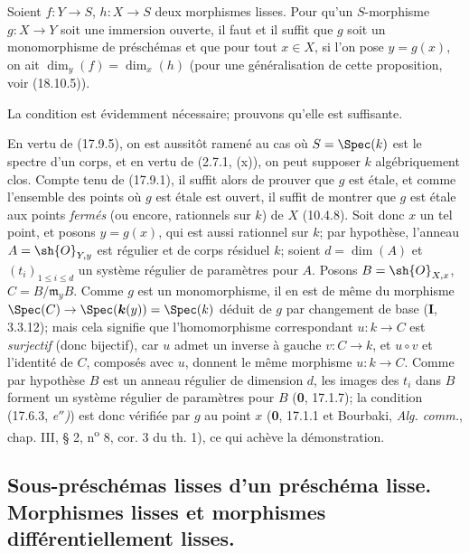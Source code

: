 \begin{proposition}[17.11.5]
\label{IV.17.11.5}
Soient $f:Y\to S$, $h:X\to S$ deux morphismes lisses. Pour qu'un $S$-morphisme $g:X\to Y$ soit une immersion ouverte, il faut et il suffit que $g$ soit un monomorphisme de préschémas et que pour tout $x\in X$, si l'on pose $y=g(x)$, on ait $\dim_y(f)=\dim_x(h)$ \textup{(pour une généralisation de cette proposition, voir (18.10.5))}.
\end{proposition}

La condition est évidemment nécessaire; prouvons qu'elle est suffisante.

En vertu de (17.9.5), on est aussitôt ramené au cas où $S=\Spec(k)$ est le spectre d'un corps, et en vertu de (2.7.1, (x)), on peut supposer $k$ algébriquement clos. Compte tenu de (17.9.1), il suffit alors de prouver que $g$ est étale, et comme l'ensemble des points où $g$ est étale est ouvert, il suffit de montrer que $g$ est étale aux points \emph{fermés} (ou encore, rationnels sur $k$) de $X$ (10.4.8). Soit donc $x$ un tel point, et posons $y=g(x)$, qui est aussi rationnel sur $k$; par hypothèse, l'anneau $A=\sh{O}_{Y,y}$ est régulier et de corps résiduel $k$; soient $d=\dim(A)$ et $(t_i)_{1\leq i\leq d}$ un système régulier de paramètres pour $A$. Posons $B=\sh{O}_{X,x}$, $C=B/\mathfrak m_yB$. Comme $g$ est un monomorphisme, il en est de même du morphisme $\Spec(C)\to\Spec(\boldsymbol{k}(y))=\Spec(k)$ déduit de $g$ par changement de base (\textbf{I}, 3.3.12); mais cela signifie que l'homomorphisme correspondant $u:k\to C$ est \emph{surjectif} (donc bijectif), car $u$ admet un inverse à gauche $v:C\to k$, et $u\circ v$ et l'identité de $C$, composés avec $u$, donnent le même morphisme $u:k\to C$. Comme par hypothèse $B$ est un anneau régulier de dimension $d$, les images des $t_i$ dans $B$ forment un système régulier de paramètres pour $B$ (\textbf{0}, 17.1.7); la condition (17.6.3, \emph{e$''$)}) est donc vérifiée par $g$ au point $x$ (\textbf{0}, 17.1.1 et Bourbaki, \emph{Alg. comm.}, chap. III, § 2, n\textsuperscript{o} 8, cor. 3 du th. 1), ce qui achève la démonstration.

\subsection{Sous-préschémas lisses d'un préschéma lisse. Morphismes lisses et morphismes différentiellement lisses.}

